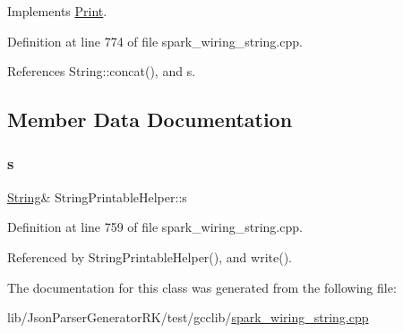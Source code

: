 Implements \hyperlink{class_print_a5be30d49adae2406a270c29ba9a3e0a3}{Print}.



Definition at line 774 of file spark\+\_\+wiring\+\_\+string.\+cpp.



References String\+::concat(), and s.



\subsection{Member Data Documentation}
\mbox{\label{class_string_printable_helper_ac8273d5d460215114d9db27d7c7cab2e}} 
\subsubsection{\texorpdfstring{s}{s}}
{\footnotesize\ttfamily \hyperlink{class_string}{String}\& String\+Printable\+Helper\+::s\hspace{0.3cm}{\ttfamily [private]}}



Definition at line 759 of file spark\+\_\+wiring\+\_\+string.\+cpp.



Referenced by String\+Printable\+Helper(), and write().



The documentation for this class was generated from the following file\+:\begin{DoxyCompactItemize}
\item 
lib/\+Json\+Parser\+Generator\+R\+K/test/gcclib/\hyperlink{spark__wiring__string_8cpp}{spark\+\_\+wiring\+\_\+string.\+cpp}\end{DoxyCompactItemize}
